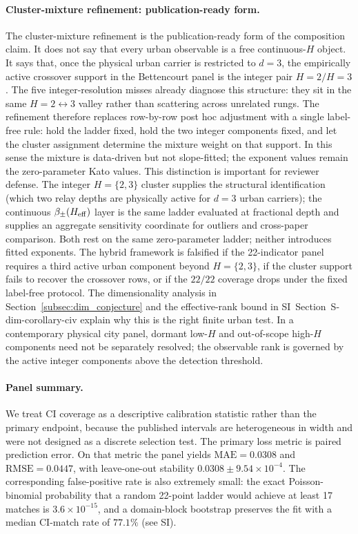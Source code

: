 \paragraph{Cluster-mixture refinement: publication-ready form.}
The cluster-mixture refinement is the publication-ready form of the
composition claim. It does not say that every urban observable is a free
continuous-\(H\) object. It says that, once the physical urban carrier is
restricted to \(d=3\), the empirically active crossover support in the
Bettencourt panel is the integer pair \(H=2/H=3\). The five integer-resolution
misses already diagnose this structure: they sit in the same
\(H=2\leftrightarrow3\) valley rather than scattering across unrelated
rungs. The refinement therefore replaces row-by-row post hoc adjustment with
a single label-free rule: hold the ladder fixed, hold the two integer
components fixed, and let the cluster assignment determine the mixture weight
on that support. In this sense the mixture is data-driven but not
slope-fitted; the exponent values remain the zero-parameter Kato values.
This distinction is important for reviewer defense. The integer
\(H{=}\{2,3\}\) cluster supplies the structural identification (which two
relay depths are physically active for $d{=}3$ urban carriers); the
continuous \(\beta_{\pm}(H_{\mathrm{eff}})\) layer is the same ladder evaluated at
fractional depth and supplies an aggregate sensitivity coordinate for
outliers and cross-paper comparison. Both rest on the same zero-parameter
ladder; neither introduces fitted exponents. The hybrid framework is
falsified if the 22-indicator panel requires a third active urban component
beyond \(H{=}\{2,3\}\), if the cluster support fails to recover the
crossover rows, or if the \(22/22\) coverage drops under the fixed
label-free protocol. The dimensionality analysis in
Section~\ref{subsec:dim_conjecture} and the effective-rank bound in
SI~Section~\textsf{S-dim-corollary-civ} explain why this is the right finite
urban test. In a contemporary physical city panel, dormant low-\(H\) and
out-of-scope high-\(H\) components need not be separately resolved; the
observable rank is governed by the active integer components above the
detection threshold.

\paragraph{Panel summary.}
We treat CI coverage as a descriptive calibration statistic rather than the
primary endpoint, because the published intervals are heterogeneous in width
and were not designed as a discrete selection test. The primary loss metric
is paired prediction error. On that metric the panel yields
$\mathrm{MAE}=0.0308$ and $\mathrm{RMSE}=0.0447$, with leave-one-out
stability $0.0308\pm 9.54\times 10^{-4}$. The corresponding false-positive
rate is also extremely small: the exact Poisson-binomial probability that a
random 22-point ladder would achieve at least 17 matches is
$3.6\times10^{-15}$, and a domain-block bootstrap preserves the fit with a
median CI-match rate of $77.1\%$ (see SI).

